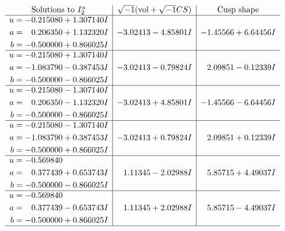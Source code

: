 \documentclass[1p]{elsarticle_modified}
\theoremstyle{definition}
\newcommand{\I}{\sqrt{-1}}
\begin{document}
$$\begin{array}{c|c|c}  
\text{Solutions to }I^u_{2}& \I (\text{vol} + \sqrt{-1}CS) & \text{Cusp shape}\\
 \hline 
\begin{aligned}
u &= -0.215080 + 1.307140 I \\
a &= \phantom{-}0.206350 + 1.132320 I \\
b &= -0.500000 + 0.866025 I\end{aligned}
 & -3.02413 - 4.85801 I & -1.45566 + 6.64456 I \\ \hline\begin{aligned}
u &= -0.215080 + 1.307140 I \\
a &= -1.083790 - 0.387453 I \\
b &= -0.500000 - 0.866025 I\end{aligned}
 & -3.02413 - 0.79824 I & \phantom{-}2.09851 - 0.12339 I \\ \hline\begin{aligned}
u &= -0.215080 - 1.307140 I \\
a &= \phantom{-}0.206350 - 1.132320 I \\
b &= -0.500000 - 0.866025 I\end{aligned}
 & -3.02413 + 4.85801 I & -1.45566 - 6.64456 I \\ \hline\begin{aligned}
u &= -0.215080 - 1.307140 I \\
a &= -1.083790 + 0.387453 I \\
b &= -0.500000 + 0.866025 I\end{aligned}
 & -3.02413 + 0.79824 I & \phantom{-}2.09851 + 0.12339 I \\ \hline\begin{aligned}
u &= -0.569840\phantom{ +0.000000I} \\
a &= \phantom{-}0.377439 + 0.653743 I \\
b &= -0.500000 - 0.866025 I\end{aligned}
 & \phantom{-}1.11345 - 2.02988 I & \phantom{-}5.85715 + 4.49037 I \\ \hline\begin{aligned}
u &= -0.569840\phantom{ +0.000000I} \\
a &= \phantom{-}0.377439 - 0.653743 I \\
b &= -0.500000 + 0.866025 I\end{aligned}
 & \phantom{-}1.11345 + 2.02988 I & \phantom{-}5.85715 - 4.49037 I\\
 \hline 
 \end{array}$$\newpage
\end{document}
